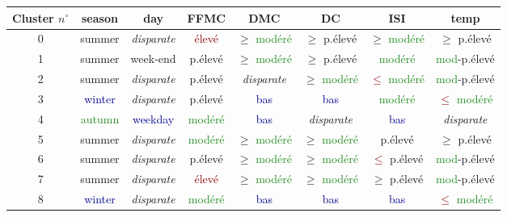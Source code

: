 \documentclass{article}
\newcommand{\blu}[1]{\textcolor{darkblue}{#1}}
\newcommand{\rouge}[1]{\textcolor{darkred}{#1}}
\newcommand{\forest}[1]{\textcolor{forestgreen}{#1}}
\newcommand{\firebrick}[1]{\textcolor{firebrick4}{#1}}
\begin{document}
\begin{sffamily}
\begin{figure}[h!]
    \begin{center}
    \label{t31}
    \begin{tabular}{|c|c|c|c|c|c|c|c|}
    \hline
    Cluster $n^\circ$ & \textbf{season} & \textbf{day} & \textbf{FFMC} & \textbf{DMC} & \textbf{DC} & \textbf{ISI} & \textbf{temp} \\
    \hline
    0 & \firebrick{summer} & \textit{disparate} & \rouge{élevé} & $\geq$ \forest{modéré} & $\geq$ \firebrick{p.élevé} &
	$\geq$ \forest{modéré} & $\geq$ \firebrick{p.élevé}\\
    \hline
    1 & \firebrick{summer} & \firebrick{week-end} & \firebrick{p.élevé} & $\geq$ \forest{modéré} & $\geq$ \firebrick{p.élevé} & 
    \forest{modéré} & \forest{mod}-\firebrick{p.élevé}\\
    \hline
    2 & \firebrick{summer} & \textit{disparate} & \firebrick{p.élevé} & \textit{disparate} & $\geq$ \forest{modéré} & 
    \rouge{$\leq$} \forest{modéré} & \forest{mod}-\firebrick{p.élevé}\\
    \hline
    3 & \blu{winter} & \textit{disparate} & \firebrick{p.élevé} & \blu{bas} & \blu{bas} &
    \forest{modéré} & \rouge{$\leq$} \forest{modéré}\\
    \hline
    4 & \forest{autumn} & \blu{weekday} & \forest{modéré} & \blu{bas} & \textit{disparate} &
    \blu{bas} & \textit{disparate}\\
    \hline
    5 & \firebrick{summer} & \textit{disparate} & \forest{modéré} & $\geq$ \forest{modéré} & $\geq$ \forest{modéré} &
    \firebrick{p.élevé} & $\geq$ \firebrick{p.élevé}\\
    \hline
    6 & \firebrick{summer} & \textit{disparate} & \firebrick{p.élevé} & $\geq$ \forest{modéré} & $\geq$ \forest{modéré} &
    \rouge{$\leq$} \firebrick{p.élevé} & \forest{mod}-\firebrick{p.élevé}\\
    \hline
    7 & \firebrick{summer} & \textit{disparate} & \rouge{élevé} & $\geq$ \forest{modéré} & $\geq$ \forest{modéré} & 
    $\geq$ \firebrick{p.élevé} & \forest{mod}-\firebrick{p.élevé}\\
    \hline
    8 & \blu{winter} & \textit{disparate} & \forest{modéré} & \blu{bas} & \blu{bas} &
    \blu{bas} & \rouge{$\leq$} \forest{modéré}\\
    \hline
    \end{tabular}
    $ $ \\$ $\\$ $\\
    \begin{tabular}{|c|c|c|c|}

\end{tabular}
\end{center}
\end{figure}
\end{sffamily}
\end{document}
